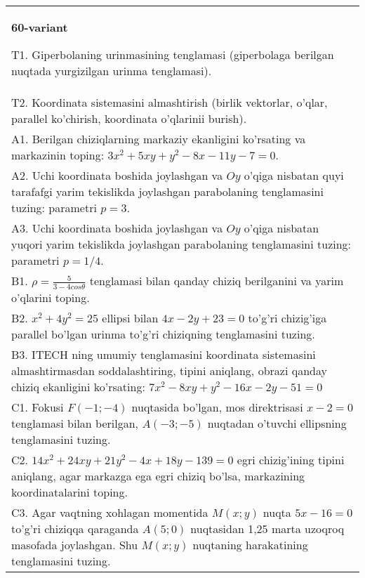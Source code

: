\documentclass{article}
\begin{document}
\begin{tabular}{m{17cm}}
\textbf{60-variant}
\newline

T1. Giperbolaning urinmasining tenglamasi (giperbolaga berilgan nuqtada yurgizilgan urinma tenglamasi).\\

T2. Koordinata sistemasini almashtirish (birlik vektorlar, o'qlar, parallel ko'chirish, koordinata o'qlarinii burish).\\

A1. Berilgan chiziqlarning markaziy ekanligini ko'rsating va markazinin toping: $3x^{2}+5xy+y^{2}-8x-11y-7=0$.\\

A2. Uchi koordinata boshida joylashgan va $Oy$ o'qiga nisbatan quyi tarafafgi yarim tekislikda joylashgan parabolaning tenglamasini tuzing: parametri $p=3$.\\

A3. Uchi koordinata boshida joylashgan va $Oy$ o'qiga nisbatan yuqori yarim tekislikda joylashgan parabolaning tenglamasini tuzing: parametri $p=1/4$.\\

B1. $\rho = \frac{5}{3 - 4cos\theta}$ tenglamasi bilan qanday chiziq berilganini va yarim o'qlarini toping.  \\

B2. $x^{2} + 4y^{2} = 25$ ellipsi bilan $4x - 2y + 23 = 0$ to'g'ri chizig'iga parallel bo'lgan urinma to'g'ri chiziqning tenglamasini tuzing.  \\

B3. ITECH ning umumiy tenglamasini koordinata sistemasini almashtirmasdan soddalashtiring, tipini aniqlang, obrazi qanday chiziq ekanligini ko'rsating: $7x^{2} - 8xy + y^{2} - 16x - 2y - 51 = 0$\\

C1. Fokusi $F( - 1; - 4)$ nuqtasida bo'lgan, mos direktrisasi $x - 2 = 0$ tenglamasi bilan berilgan, $A( - 3; - 5)$ nuqtadan o'tuvchi ellipsning tenglamasini tuzing.  \\

C2. $14x^{2} + 24xy + 21y^{2} - 4x + 18y - 139 = 0$ egri chizig'ining tipini aniqlang, agar markazga ega egri chiziq bo'lsa, markazining koordinatalarini toping.  \\

C3. Agar vaqtning xohlagan momentida $M(x;y)$ nuqta $5x - 16 = 0$ to'g'ri chiziqqa qaraganda $A(5;0)$ nuqtasidan 1,25 marta uzoqroq masofada joylashgan. Shu $M(x;y)$ nuqtaning harakatining tenglamasini tuzing.  \\

\end{tabular}
\vspace{1cm}
\end{document}
